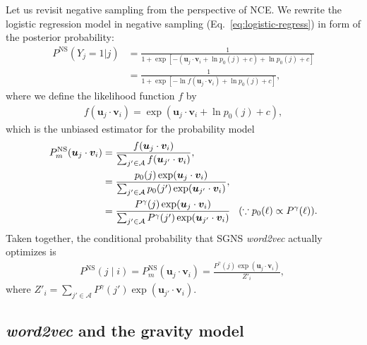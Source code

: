 \documentclass[12pt,draft,a4paper]{article}
\newcommand{\vect}[1]{\boldsymbol{#1}}
\def\given{\mid}
\begin{document}
Let us revisit negative sampling from the perspective of NCE.
We rewrite the logistic regression model in negative sampling (Eq.~\eqref{eq:logistic-regress}) in form of the posterior probability:
\begin{align}
	P^{\text{NS}}\left(Y_{j}=1 \vert j\right) & = \frac{
		1
	}{
		1 + \exp\left[ - \left( \vect{u}_j \cdot \vect{v}_{i} + \ln p_0(j) + c \right) + \ln p_0(j) + c \right]
	}                                                    \\
	                                          & = \frac{
		1
	}{
		1 + \exp\left[ - \ln f(\vect{u}_j \cdot \vect{v}_{i}) + \ln p_0(j) + c \right]
	},
\end{align}
where we define the likelihood function $f$ by
\begin{align}
	f(\vect{u}_j \cdot \vect{v}_{i}) = \exp\left( \vect{u}_j \cdot \vect{v}_{i} + \ln p_0(j) + c\right),
\end{align}
which is the unbiased estimator for the probability model
\begin{align}
	\label{eq:unbiasef}
	P_m^{\text{NS}}(\vect{u}_j \cdot \vect{v}_{i}) & = \frac{ f(\vect{u}_j \cdot \vect{v}_{i}) }{\sum_{ j' \in {\cal A}} f(\vect{u}_{j'} \cdot \vect{v}_{i}) },                                                                                               \\
	                                               & = \frac{  p_0(j)\exp( \vect{u}_j \cdot \vect{v}_{i} ) }{\sum_{j' \in \mathcal{A}}  p_0(j') \exp(\vect{u}_{j'} \cdot \vect{v}_{i})},                                                                      \\
	                                               & = \frac{  P^\gamma(j)\exp( \vect{u}_j \cdot \vect{v}_{i} ) }{\sum_{j' \in \mathcal{A}}  P^\gamma(j') \exp(\vect{u}_{j'} \cdot \vect{v}_{i})} \hspace{0.3cm}(\because p_0(\ell) \propto P^\gamma (\ell)).
\end{align}
Taken together, the conditional probability that SGNS \textit{word2vec} actually optimizes is
\begin{align}
	P^{\text{NS}}(j\given i) = P_m^{\text{NS}}(\vect{u}_j \cdot \vect{v}_{i})  =  \frac{  P^\gamma(j)\exp( \vect{u}_j \cdot \vect{v}_{i} ) }{Z'_i},\
\end{align}
where $Z'_i=\sum_{j' \in \mathcal{A}}  P^\gamma(j') \exp(\vect{u}_{j'} \cdot \vect{v}_{i})$.

\subsection{\textit{word2vec} and the gravity model}
\end{document}
